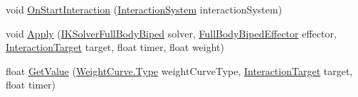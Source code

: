 \begin{DoxyCompactItemize}
void \mbox{\hyperlink{class_root_motion_1_1_final_i_k_1_1_interaction_object_accd0d6d527e3961d08d1145bcd966429}{On\+Start\+Interaction}} (\mbox{\hyperlink{class_root_motion_1_1_final_i_k_1_1_interaction_system}{Interaction\+System}} interaction\+System)
\item 
void \mbox{\hyperlink{class_root_motion_1_1_final_i_k_1_1_interaction_object_a0aaccdd85aa57b6cbb254594846e18e1}{Apply}} (\mbox{\hyperlink{class_root_motion_1_1_final_i_k_1_1_i_k_solver_full_body_biped}{I\+K\+Solver\+Full\+Body\+Biped}} solver, \mbox{\hyperlink{namespace_root_motion_1_1_final_i_k_ae0dd2058c7667b6f132c11a6b860c14a}{Full\+Body\+Biped\+Effector}} effector, \mbox{\hyperlink{class_root_motion_1_1_final_i_k_1_1_interaction_target}{Interaction\+Target}} target, float timer, float weight)
\item 
float \mbox{\hyperlink{class_root_motion_1_1_final_i_k_1_1_interaction_object_a005ae5c3bbe368690cc488272170449d}{Get\+Value}} (\mbox{\hyperlink{class_root_motion_1_1_final_i_k_1_1_interaction_object_1_1_weight_curve_a74c8be2e80ace86b130c88e275300b27}{Weight\+Curve.\+Type}} weight\+Curve\+Type, \mbox{\hyperlink{class_root_motion_1_1_final_i_k_1_1_interaction_target}{Interaction\+Target}} target, float timer)
\end{DoxyCompactItemize}
